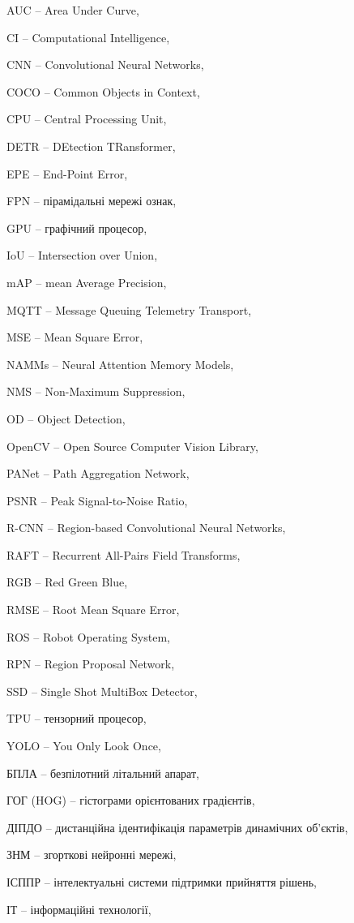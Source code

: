 \documentclass[
]{article}
\begin{document}
AUC -- Area Under Curve,

CI -- Computational Intelligence,

CNN -- Convolutional Neural Networks,

COCO -- Common Objects in Context,

CPU -- Central Processing Unit,

DETR -- DEtection TRansformer,

EPE -- End-Point Error,

FPN -- пірамідальні мережі ознак,

GPU -- графічний процесор,

IoU -- Intersection over Union,

mAP -- mean Average Precision,

MQTT -- Message Queuing Telemetry Transport,

MSE -- Mean Square Error,

NAMMs -- Neural Attention Memory Models,

NMS -- Non-Maximum Suppression,

OD -- Object Detection,

OpenCV -- Open Source Computer Vision Library,

PANet -- Path Aggregation Network,

PSNR -- Peak Signal-to-Noise Ratio,

R-CNN -- Region-based Convolutional Neural Networks,

RAFT -- Recurrent All-Pairs Field Transforms,

RGB -- Red Green Blue,

RMSE -- Root Mean Square Error,

ROS -- Robot Operating System,

RPN -- Region Proposal Network,

SSD -- Single Shot MultiBox Detector,

TPU -- тензорний процесор,

YOLO -- You Only Look Once,

БПЛА -- безпілотний літальний апарат,

ГОГ (HOG) -- гістограми орієнтованих градієнтів,

ДІПДО -- дистанційна ідентифікація параметрів динамічних об'єктів,

ЗНМ -- згорткові нейронні мережі,

ІСППР -- інтелектуальні системи підтримки прийняття рішень,

ІТ -- інформаційні технології,
\end{document}
